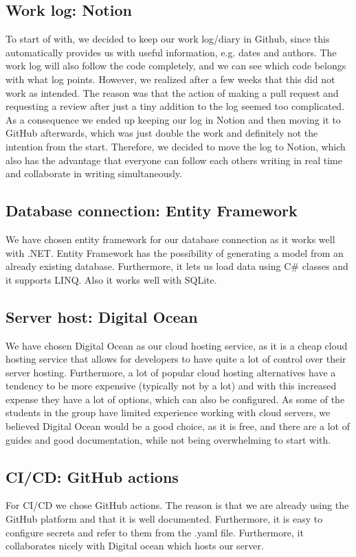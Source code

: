 \subsection{Work log: Notion}
To start of with, we decided to keep our work log/diary in Github, since this automatically provides us with useful information, e.g. dates and authors. The work log will also follow the code completely, and we can see which code belongs with what log points. However, we realized after a few weeks that this did not work as intended. The reason was that the action of making a pull request and requesting a review after just a tiny addition to the log seemed too complicated.  As a consequence we ended up keeping our log in Notion and then moving it to GitHub afterwards, which was just double the work and definitely not the intention from the start. Therefore, we decided to move the log to Notion, which also has the advantage that everyone can follow each others writing in real time and collaborate in writing simultaneously.

\subsection{Database connection: Entity Framework}
We have chosen entity framework for our database connection as it works well with .NET. Entity Framework has the possibility of generating a model from an already existing database. Furthermore, it lets us load data using C\# classes and it supports LINQ. Also it works well with SQLite.

\subsection{Server host: Digital Ocean}
We have chosen Digital Ocean as our cloud hosting service, as it is a cheap cloud hosting service that allows for developers to have quite a lot of control over their server hosting. Furthermore, a lot of popular cloud hosting alternatives have a tendency to be more expensive (typically not by a lot) and with this increased expense they have a lot of options, which can also be configured. As some of the students in the group have limited experience working with cloud servers, we believed Digital Ocean would be a good choice, as it is free, and there are a lot of guides and good documentation, while not being overwhelming to start with.

\subsection{CI/CD: GitHub actions}
For CI/CD we chose GitHub actions. The reason is that we are already using the GitHub platform and that it is well documented. Furthermore, it is easy to configure secrets and refer to them from the .yaml file. Furthermore, it collaborates nicely with Digital ocean which hosts our server.


